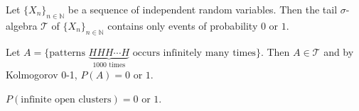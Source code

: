 \documentclass[11pt,singlecolumn, openany, citestyle=authoryear]{elegantbook}
\begin{document}
\begin{CJK}{UTF8}{gbsn}
\begin{theorem}
    Let $\{X_n\}_{n \in \mathbb{N}}$
    be a sequence of independent random
    variables. Then the tail $\sigma$-algebra $\mathcal{T}$ of $\{X_n\}_{n \in \mathbb{N}}$
    contains only events of probability $0$ or $1$.
\end{theorem}

\begin{example}
    Let $A=\{\text{patterns }\underbrace{HHH\cdots H}_{1000 \text{ times}} \text{ occurs 
    infinitely many times}\}$.
    Then $A\in \mathcal{T}$ and by Kolmogorov 0-1, $P(A)=0$ or $1$. 
\end{example}
\begin{example}[(Percolation)]
    $P(\text{infinite open clusters})=0$ or $1$.
\end{example}




\nocite{durrett2019probability}
\nocite{grimmett2020probability}
\nocite{maoshisong}
\nocite{zhouminqiang}
\nocite{HTOP}
\nocite{PLT}
\nocite{zhou08}
\printbibliography[title = References]

\end{CJK}
\end{document}
